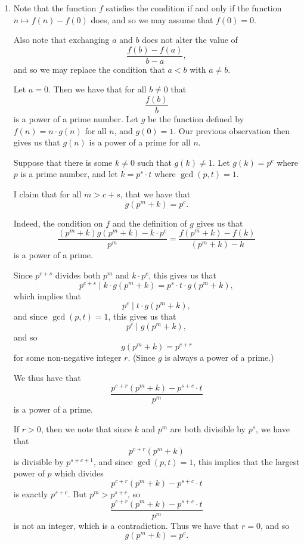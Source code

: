 \documentclass[12pt]{article}
\begin{document}
\begin{enumerate}
\item %
Note that the function $f$ satisfies the condition if and only if the function
$n \mapsto f(n) - f(0)$ does, and so we may assume that $f(0) = 0$.

Also note that exchanging $a$ and $b$ does not alter the value of
\[
    \frac{f(b) - f(a)}{b - a},
\]
and so we may replace the condition that $a < b$ with $a \neq b$.

Let $a = 0$. Then we have that for all $b \neq 0$ that
\[
    \frac{f(b)}{b}
\]
is a power of a prime number.
Let $g$ be the function defined by $f(n) = n \cdot g(n)$ for all $n$, and $g(0)
= 1$. Our previous observation then gives us that $g(n)$ is a power of a prime
for all $n$.

Suppose that there is some $k \neq 0$ such that $g(k) \neq 1$. Let $g(k) = p^c$
where $p$ is a prime number, and let $k = p^s \cdot t$ where $\gcd(p, t) = 1$.

I claim that for all $m > c + s$, that we have that
\[
    g\left( p^m + k \right) = p^c.
\]

Indeed, the condition on $f$ and the definition of $g$ gives us that
\[
    \frac{\left(p^m + k\right) g\left(p^m + k\right) - k \cdot p^c}{p^m} =
    \frac{f\left(p^m + k\right) - f(k)}{\left(p^m + k\right) - k}
\]
is a power of a prime.

Since $p^{c + s}$ divides both $p^m$ and $k \cdot p^c$, this gives us that
\[
    p^{c + s} \mid k \cdot g \left( p^m + k \right) = p^s \cdot t \cdot g \left(
    p^m + k \right),
\]
which implies that
\[
    p^c \mid t \cdot g \left( p^m + k \right),
\]
and since $\gcd(p, t) = 1$, this gives us that
\[
    p^c \mid g \left( p^m + k \right),
\]
and so
\[
    g \left( p^m + k \right) = p^{c + r}
\]
for some non-negative integer $r$. (Since $g$ is always a power of a prime.)

We thus have that
\[
    \frac{p^{c + r} \left( p^m + k \right) - p^{s + c} \cdot t}{p^m}
\]
is a power of a prime.

If $r > 0$, then we note that since $k$ and $p^m$ are both divisible by $p^s$,
we have that
\[
    p^{c + r} \left( p^m + k \right)
\]
is divisible by $p^{s + c + 1}$, and since $\gcd(p, t) = 1$, this implies that
the largest power of $p$ which divides
\[
    p^{c + r} \left( p^m + k \right) - p^{s + c} \cdot t
\]
is exactly $p^{s + c}$. But $p^m > p^{s + c}$, so
\[
    \frac{p^{c + r} \left( p^m + k \right) - p^{s + c} \cdot t}{p^m}
\]
is not an integer, which is a contradiction. Thus we have that $r = 0$, and so
\[
    g \left( p^m + k \right) = p^c.
\]


\end{enumerate}
\end{document}
